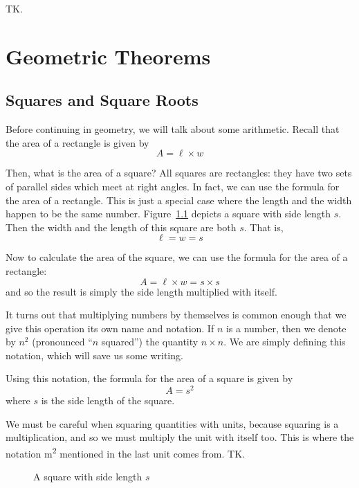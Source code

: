 \documentclass[a4paper,10pt]{report}
\begin{document}
TK.

\chapter{Geometric Theorems}

\section{Squares and Square Roots}

Before continuing in geometry, we will talk about some arithmetic. Recall that
the area of a rectangle is given by \[
  A = \ell \times w
\]

Then, what is the area of a square? All squares are rectangles: they have two
sets of parallel sides which meet at right angles. In fact, we can use the
formula for the area of a rectangle. This is just a special case where the
length and the width happen to be the same number. Figure~\ref{gt:square-s}
depicts a square with side length \(s\). Then the width and the length of this
square are both \(s\). That is, \[
  \ell = w = s
\]

Now to calculate the area of the square, we can use the formula for the area of
a rectangle: \[
  A = \ell \times w = s \times s
\] and so the result is simply the side length multiplied with itself.

It turns out that multiplying numbers by themselves is common enough that we
give this operation its own name and notation. If \(n\) is a number, then we
denote by \(n^2\) (pronounced ``\(n\) squared'') the quantity \(n\times n\). We
are simply defining this notation, which will save us some writing.

Using this notation, the formula for the area of a square is given by
\begin{equation}
  A = s^2
\end{equation} where \(s\) is the side length of the square.

We must be careful when squaring quantities with units, because squaring is a
multiplication, and so we must multiply the unit with itself too. This is where
the notation \si{\metre\squared} mentioned in the last unit comes from. TK.

\begin{figure}

  \caption{A square with side length \(s\)}
  \label{gt:square-s}
\end{figure}
\end{document}
